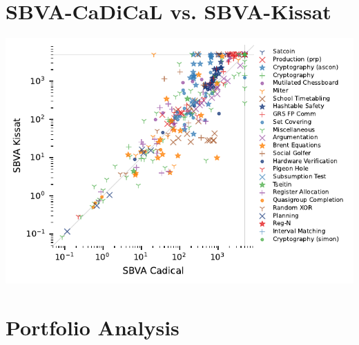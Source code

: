 \documentclass{article}
\begin{document}
\section{SBVA-CaDiCaL vs. SBVA-Kissat}
\setlength{\tabcolsep}{.4em}

\includegraphics{gen/sc2023/sbva_cadical_kissat_logscale.pdf}

% 

% 

\section{Portfolio Analysis}


\setlength{\tabcolsep}{.4em}

\end{document}
